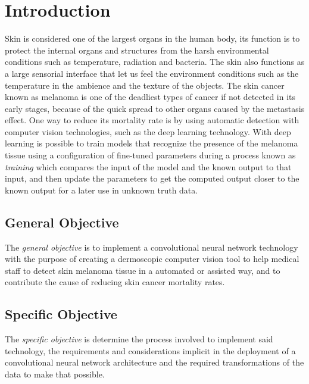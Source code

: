 \section{Introduction}
Skin is considered one of the largest organs in the human body, its function is to protect the internal organs and structures from the harsh environmental conditions such as temperature, radiation and bacteria. The skin also functions as a large sensorial interface that let us feel the environment conditions such as the temperature in the ambience and the texture of the objects.
The skin cancer known as melanoma is one of the deadliest types of cancer if not detected in its early stages, because of the quick spread to other organs caused by the metastasis effect. One way to reduce its mortality rate is by using automatic detection with computer vision technologies, such as the deep learning technology. With deep learning is possible to train models that recognize the presence of the melanoma tissue using a configuration of fine-tuned parameters during a process known as \emph{training} which compares the input of the model and the known output to that input, and then update the parameters to get the computed output closer to the known output for a later use in unknown truth data.

\subsection{General Objective}
The \emph{general objective} is to implement a convolutional neural network technology with the purpose of creating a dermoscopic computer vision tool to help medical staff to detect skin melanoma tissue in a automated or assisted way, and to contribute the cause of reducing skin cancer mortality rates.

\subsection{Specific Objective}
The \emph{specific objective} is determine the process involved to implement said technology, the requirements and considerations implicit in the deployment of a convolutional neural network architecture and the required transformations of the data to make that possible.

